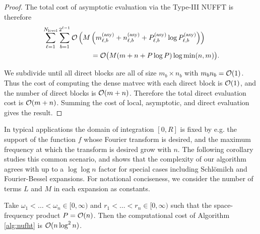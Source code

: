 \begin{proof}

    The total cost of asymptotic evaluation via the Type-III NUFFT is therefore
    \begin{align}
        & \sum_{\ell=1}^{N_{\text{level}}} \sum_{b=1}^{2^{\ell-1}} \bO\left(M\left(m_{\ell,b}^{(\text{asy})} + n_{\ell,b}^{(\text{asy})} + P_{\ell,b}^{(\text{asy})} \log P_{\ell,b}^{(\text{asy})} \right)\right) \\
        &\hspace*{0.2\textwidth} = \bO\big(M (m + n + P\log P) \log \min(n,m) \big).
    \end{align}

    We subdivide until all direct blocks are all of size $m_b \times n_b$ with
    $m_bn_b = \mathcal{O}(1)$. Thus the cost of computing the dense matvec with each
    direct block is $\mathcal{O}(1)$, and the number of direct blocks is $\mathcal{O}(m + n)$.
    Therefore the total direct evaluation cost is $\mathcal{O}(m + n)$. Summing the cost
    of local, asymptotic, and direct evaluation gives the result.
\end{proof}

In typical applications the domain of integration $[0,R]$ is fixed by e.g. the
support of the function $f$ whose Fourier transform is desired, and the maximum
frequency at which the transform is desired grow with $n$. The following
corollary studies this common scenario, and shows that the complexity of our
algorithm agrees with \cite{townsend2015fast} up to a $\log\log n$ factor for
special cases including Schl\"omilch and Fourier-Bessel expansions. For notational conciseness, we consider the number of terms $L$ and $M$ in each expansion as constants.
\begin{corollary}
    Take $\omega_1 < \dots < \omega_n \in [0,\infty)$ and $r_1 < \dots < r_n \in
    [0,\infty)$ such that the space-frequency product $P = \mathcal{O}(n)$. Then the
    computational cost of Algorithm \ref{alg:nufht} is $\mathcal{O}(n\log^2n)$.
\end{corollary}

